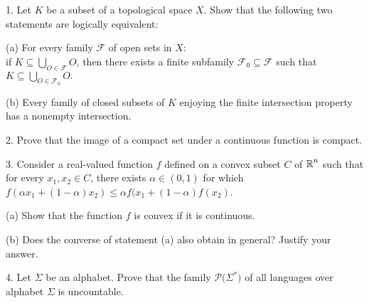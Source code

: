 \documentclass[11pt]{article}
\newcommand{\Rset}{\hbox{$\mathbb R$}}
\theoremstyle{thmstyle}
\begin{document}

\thispagestyle{firstpage} %

\setlength{\abovedisplayskip}{20pt} %
\setlength{\belowdisplayskip}{20pt} %






\begin{myitemize}  
\item[1.] Let $K$ be a subset of a topological space $X$.  Show that the following two statements are logically equivalent:
\begin{myitemize}\setlength{\itemsep}{1em}

    \item[(a)] For every family $\mathcal{F}$ of open sets in $X$:\\
    
   if $\displaystyle K\subseteq \bigcup_{O\in \mathcal{F}}O$, then there exists a finite subfamily    $\displaystyle\mathcal{F}_{0}\subseteq \mathcal{F}$ such that  $\displaystyle K\subseteq \bigcup_{O\in \mathcal{F}_{0}}O.$ 
    
    \item[(b)] Every family of closed subsets of $K$ enjoying the finite intersection property has a nonempty intersection.
\end{myitemize}

\item[2.] Prove that the image of a compact set under a continuous function is compact.

\item[3.] Consider a real-valued function $f$ defined on a convex subset $C$ of $\Rset^{n}$ such that for every $x_{1},x_{2}\in C$, there exists $\alpha\in (0,1)$ for which $f(\alpha x_{1} +(1-\alpha)x_{2})\leq \alpha f( x_{1} +(1-\alpha)f(x_{2})$.
\begin{myitemize}\setlength{\itemsep}{0.5em}
    \item[(a)] Show that the function $f$ is convex if it is continuous.
    \item[(b)] Does the converse of statement (a) also  obtain in general?  Justify your answer.
\end{myitemize}

\item[4.]  Let $\Sigma$ be an alphabet.  Prove that the family $\mathcal{P}\bigl(\Sigma^{*}\bigr)$ of all languages over alphabet $\Sigma$ is uncountable.


\end{myitemize}
\end{document}
